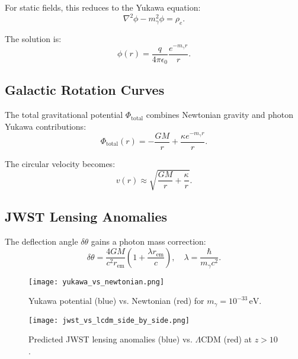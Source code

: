 \documentclass[12pt, a4paper]{article}
\begin{document}
For static fields, this reduces to the Yukawa equation:
\begin{equation}
\nabla^2 \phi - m_\gamma^2 \phi = \rho_e.
\label{eq:yukawa}
\end{equation}

The solution is:
\begin{equation}
\phi(r) = \frac{q}{4\pi \epsilon_0} \frac{e^{-m_\gamma r}}{r}.
\label{eq:yukawa_sol}
\end{equation}

\subsection{Galactic Rotation Curves}
\label{subsec:rotation}

The total gravitational potential \( \Phi_{\text{total}} \) combines Newtonian gravity and photon Yukawa contributions:
\begin{equation}
\Phi_{\text{total}}(r) = -\frac{GM}{r} + \frac{\kappa e^{-m_\gamma r}}{r}.
\label{eq:total_potential}
\end{equation}

The circular velocity becomes:
\begin{equation}
v(r) \approx \sqrt{\frac{GM}{r} + \frac{\kappa}{r}}.
\label{eq:velocity}
\end{equation}

\subsection{JWST Lensing Anomalies}
\label{subsec:lensing}

The deflection angle \( \delta \theta \) gains a photon mass correction:
\begin{equation}
\delta \theta = \frac{4GM}{c^2 r_{\text{em}}} \left(1 + \frac{\lambda r_{\text{em}}}{c}\right), \quad \lambda = \frac{\hbar}{m_\gamma c^2}.
\label{eq:lensing}
\end{equation}

\begin{figure}[t]
\centering
\texttt{[image: yukawa\_vs\_newtonian.png]}
\caption{Yukawa potential (blue) vs. Newtonian (red) for \( m_\gamma = 10^{-33} \, \text{eV} \).}
\label{fig:yukawa}
\end{figure}

\begin{figure}[t]
\centering
\texttt{[image: jwst\_vs\_lcdm\_side\_by\_side.png]}
\caption{Predicted JWST lensing anomalies (blue) vs. \(\Lambda\)CDM (red) at \( z > 10 \).}
\label{fig:lensing_anomaly}
\end{figure}
\end{document}
